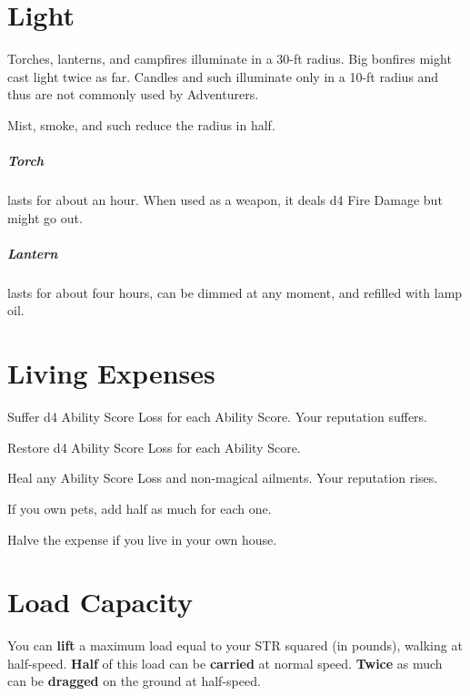 \documentclass[itdr/core]{subfiles}
\begin{document}
\vfill

\section{Light}

Torches, lanterns, and campfires illuminate in a \mbox{30-ft} radius. Big bonfires might cast light twice as far. Candles and such illuminate only in a 10-ft radius and thus are not commonly used by Adventurers.

Mist, smoke, and such reduce the radius in half.

\subparagraph{Torch} lasts for about an hour. When used as a weapon, it deals d4 Fire Damage but might go out.

\subparagraph{Lantern} lasts for about four hours, can be dimmed at any moment, and refilled with lamp oil.

\vfill

\section{Living Expenses}

Suffer d4 Ability Score Loss for each Ability Score. Your reputation suffers.

Restore d4 Ability Score Loss for each Ability Score.

Heal any Ability Score Loss and non-magical ailments. Your reputation rises.

If you own pets, add half as much for each one.

Halve the expense if you live in your own house.

\vfill

\section{Load Capacity}

You can \textbf{lift} a maximum load equal to your STR squared (in pounds), walking at half-speed. \textbf{Half} of this load can be \textbf{carried} at normal speed. \textbf{Twice} as much can be \textbf{dragged} on the ground at half-speed.
\end{document}
